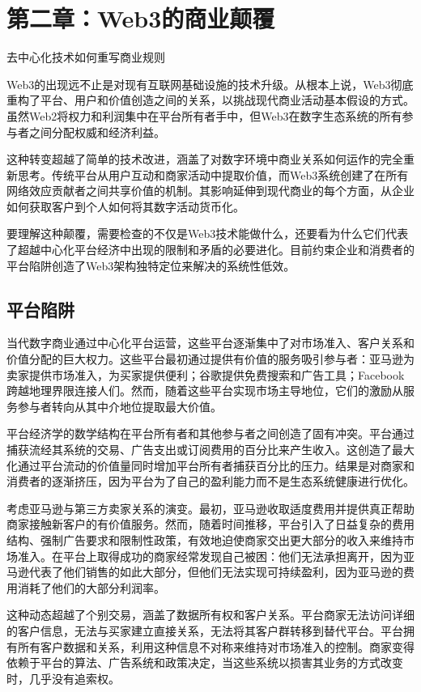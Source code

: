 \documentclass[
  Letterpaper,
]{scrbook}
\begin{document}
\chapter{第二章：Web3的商业颠覆}\label{sec-web3-disruption}

去中心化技术如何重写商业规则

Web3的出现远不止是对现有互联网基础设施的技术升级。从根本上说，Web3彻底重构了平台、用户和价值创造之间的关系，以挑战现代商业活动基本假设的方式。虽然Web2将权力和利润集中在平台所有者手中，但Web3在数字生态系统的所有参与者之间分配权威和经济利益。

这种转变超越了简单的技术改进，涵盖了对数字环境中商业关系如何运作的完全重新思考。传统平台从用户互动和商家活动中提取价值，而Web3系统创建了在所有网络效应贡献者之间共享价值的机制。其影响延伸到现代商业的每个方面，从企业如何获取客户到个人如何将其数字活动货币化。

要理解这种颠覆，需要检查的不仅是Web3技术能做什么，还要看为什么它们代表了超越中心化平台经济中出现的限制和矛盾的必要进化。目前约束企业和消费者的平台陷阱创造了Web3架构独特定位来解决的系统性低效。

\section{平台陷阱}\label{ux5e73ux53f0ux9677ux9631}

当代数字商业通过中心化平台运营，这些平台逐渐集中了对市场准入、客户关系和价值分配的巨大权力。这些平台最初通过提供有价值的服务吸引参与者：亚马逊为卖家提供市场准入，为买家提供便利；谷歌提供免费搜索和广告工具；Facebook跨越地理界限连接人们。然而，随着这些平台实现市场主导地位，它们的激励从服务参与者转向从其中介地位提取最大价值。

平台经济学的数学结构在平台所有者和其他参与者之间创造了固有冲突。平台通过捕获流经其系统的交易、广告支出或订阅费用的百分比来产生收入。这创造了最大化通过平台流动的价值量同时增加平台所有者捕获百分比的压力。结果是对商家和消费者的逐渐挤压，因为平台为了自己的盈利能力而不是生态系统健康进行优化。

考虑亚马逊与第三方卖家关系的演变。最初，亚马逊收取适度费用并提供真正帮助商家接触新客户的有价值服务。然而，随着时间推移，平台引入了日益复杂的费用结构、强制广告要求和限制性政策，有效地迫使商家交出更大部分的收入来维持市场准入。在平台上取得成功的商家经常发现自己被困：他们无法承担离开，因为亚马逊代表了他们销售的如此大部分，但他们无法实现可持续盈利，因为亚马逊的费用消耗了他们的大部分利润率。

这种动态超越了个别交易，涵盖了数据所有权和客户关系。平台商家无法访问详细的客户信息，无法与买家建立直接关系，无法将其客户群转移到替代平台。平台拥有所有客户数据和关系，利用这种信息不对称来维持对市场准入的控制。商家变得依赖于平台的算法、广告系统和政策决定，当这些系统以损害其业务的方式改变时，几乎没有追索权。
\end{document}
